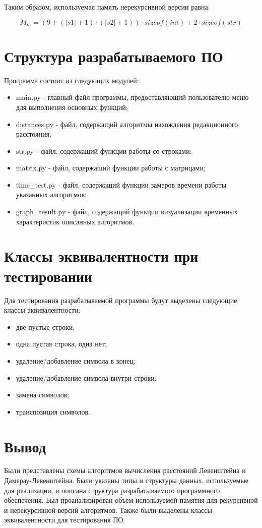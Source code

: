 Таким образом, используемая память нерекурсивной версии равна:

\begin{equation}
	\label{eq:mm}
	M_{m} = (9+(|s1|+1) \cdot (|s2|+1)) \cdot sizeof(int)+2 \cdot sizeof(str)
\end{equation}

\section{Структура разрабатываемого ПО}

Программа состоит из следующих модулей:

\begin{itemize}
	\item main.py - главный файл программы, предоставляющий пользователю меню для выполнения основных функций;
	\item distances.py - файл, содержащий алгоритмы нахождения редакционного расстояния;
	\item str.py - файл, содержащий функции работы со строками;
	\item matrix.py - файл, содержащий функции работы с матрицами;
	\item time\_test.py - файл, содержащий функции замеров времени работы указанных алгоритмов;
	\item graph\_result.py - файл, содержащий функции визуализации временных характеристик описанных алгоритмов.
\end{itemize}

\section{Классы эквивалентности при тестировании}

Для тестирования разрабатываемой программы будут выделены следующие классы эквивалентности:

\begin{itemize}
	\item две пустые строки;
	\item одна пустая строка, одна нет;
	\item удаление/добавление символа в конец;
	\item удаление/добавление символа внутри строки;
	\item замена символов;
	\item транспозиция символов.
\end{itemize}

\section{Вывод}

Были представлены схемы алгоритмов вычисления расстояний Левенштейна и Дамерау-Левенштейна. Были указаны типы и структуры данных, используемые для реализации, и описана структура разрабатываемого программного обеспечения. Был проанализирован объем используемой памятия для рекурсивной и нерекурсивной версий алгоритмов. Также были выделены классы эквивалентности для тестирования ПО.
